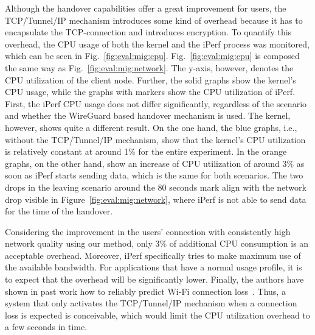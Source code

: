 Although the handover capabilities offer a great improvement for users, the TCP/Tunnel/IP mechanism introduces some kind of overhead because it has to encapsulate the TCP-connection and introduces encryption.
To quantify this overhead, the CPU usage of both the kernel and the iPerf process was monitored, which can be seen in Fig.~\ref{fig:eval:mig:cpu}.
Fig.~\ref{fig:eval:mig:cpu} is composed the same way as Fig.~\ref{fig:eval:mig:network}.
The y-axis, however, denotes the CPU utilization of the client node.
Further, the solid graphs show the kernel's CPU usage, while the graphs with markers show the CPU utilization of iPerf.
First, the iPerf CPU usage does not differ significantly, regardless of the scenario and whether the WireGuard based handover mechanism is used.
The kernel, however, shows quite a different result.
On the one hand, the blue graphs, i.e., without the TCP/Tunnel/IP mechanism, show that the kernel's CPU utilization is relatively constant at around 1\% for the entire experiment.
In the orange graphs, on the other hand, show an increase of CPU utilization of around 3\% as soon as iPerf starts sending data, which is the same for both scenarios.
The two drops in the leaving scenario around the 80 seconds mark align with the network drop visible in Figure~\ref{fig:eval:mig:network}, where iPerf is not able to send data for the time of the handover.

Considering the improvement in the users' connection with consistently high network quality using our method, only 3\% of additional CPU consumption is an acceptable overhead.
Moreover, iPerf specifically tries to make maximum use of the available bandwidth.
For applications that have a normal usage profile, it is to expect that the overhead will be significantly lower.
Finally, the authors have shown in past work how to reliably predict Wi-Fi connection loss~\cite{hochst2019learning}.
Thus, a system that only activates the TCP/Tunnel/IP mechanism when a connection loss is expected is conceivable, which would limit the CPU utilization overhead to a few seconds in time.
